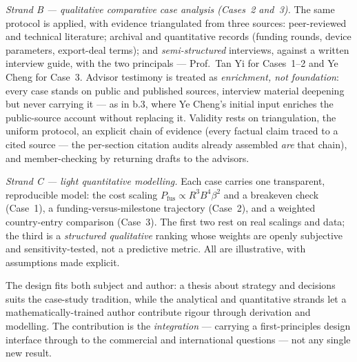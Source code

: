 \documentclass[11pt]{article}
\begin{document}
\emph{Strand B --- qualitative comparative case analysis (Cases~2 and~3).} The same protocol is applied, with evidence triangulated from three sources: peer-reviewed and technical literature; archival and quantitative records (funding rounds, device parameters, export-deal terms); and \emph{semi-structured} interviews, against a written interview guide, with the two principals --- Prof.\ Tan Yi for Cases~1--2 and Ye Cheng for Case~3. Advisor testimony is treated as \emph{enrichment, not foundation}: every case stands on public and published sources, interview material deepening but never carrying it --- as in b.3, where Ye Cheng's initial input enriches the public-source account without replacing it. Validity rests on triangulation, the uniform protocol, an explicit chain of evidence (every factual claim traced to a cited source --- the per-section citation audits already assembled \emph{are} that chain), and member-checking by returning drafts to the advisors.

\emph{Strand C --- light quantitative modelling.} Each case carries one transparent, reproducible model: the cost scaling $P_{\mathrm{fus}}\propto R^{3}B^{4}\beta^{2}$ and a breakeven check (Case~1), a funding-versus-milestone trajectory (Case~2), and a weighted country-entry comparison (Case~3). The first two rest on real scalings and data; the third is a \emph{structured qualitative} ranking whose weights are openly subjective and sensitivity-tested, not a predictive metric. All are illustrative, with assumptions made explicit.

The design fits both subject and author: a thesis about strategy and decisions suits the case-study tradition, while the analytical and quantitative strands let a mathematically-trained author contribute rigour through derivation and modelling. The contribution is the \emph{integration} --- carrying a first-principles design interface through to the commercial and international questions --- not any single new result.
\end{document}
